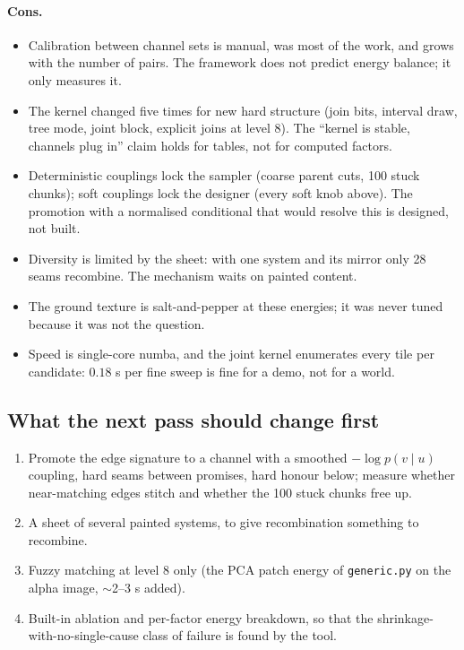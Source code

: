 \documentclass[11pt]{article}
\newcommand{\1}{\mathds{1}}
\newcommand{\code}[1]{\texttt{#1}}
\begin{document}
\paragraph{Cons.}
\begin{itemize}
\item Calibration between channel sets is manual, was most of the work, and
  grows with the number of pairs. The framework does not predict energy
  balance; it only measures it.
\item The kernel changed five times for new hard structure (join bits,
  interval draw, tree mode, joint block, explicit joins at level 8). The
  ``kernel is stable, channels plug in'' claim holds for tables, not for
  computed factors.
\item Deterministic couplings lock the sampler (coarse parent cuts, 100
  stuck chunks); soft couplings lock the designer (every soft knob above).
  The promotion with a normalised conditional that would resolve this is
  designed, not built.
\item Diversity is limited by the sheet: with one system and its mirror
  only 28 seams recombine. The mechanism waits on painted content.
\item The ground texture is salt-and-pepper at these energies; it was never
  tuned because it was not the question.
\item Speed is single-core numba, and the joint kernel enumerates every
  tile per candidate: $0.18$ s per fine sweep is fine for a demo, not for
  a world.
\end{itemize}

\subsection{What the next pass should change first}

\begin{enumerate}
\item Promote the edge signature to a channel with a smoothed
  $-\log p(v \mid u)$ coupling, hard seams between promises, hard honour
  below; measure whether near-matching edges stitch and whether the 100
  stuck chunks free up.
\item A sheet of several painted systems, to give recombination something
  to recombine.
\item Fuzzy matching at level 8 only (the PCA patch energy of
  \code{generic.py} on the alpha image, $\sim$2--3 s added).
\item Built-in ablation and per-factor energy breakdown, so that the
  shrinkage-with-no-single-cause class of failure is found by the tool.
\end{enumerate}
\end{document}
